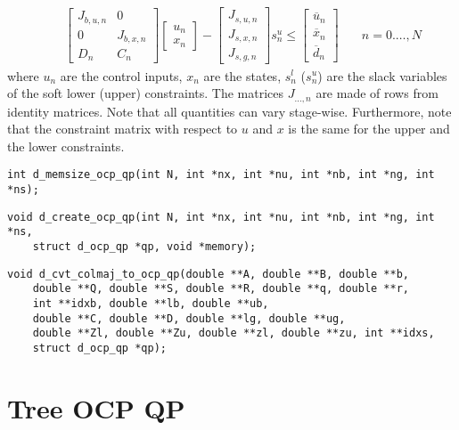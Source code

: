 \documentclass[a4paper]{report}
\begin{document}
\begin{align*}
& \quad \begin{bmatrix} J_{b,u,n} & 0 \\ 0 & J_{b,x,n} \\ D_n & C_n \end{bmatrix} \begin{bmatrix} u_n \\ x_n \end{bmatrix} - \begin{bmatrix} J_{s,u,n} \\ J_{s,x,n} \\ J_{s,g,n} \end{bmatrix} s^u_n \leq \begin{bmatrix} \overline u_n \\ \overline x_n \\ \overline d_n \end{bmatrix} & \quad n=0.\dots,N
\end{align*}
where $u_n$ are the control inputs, $x_n$ are the states, $s^l_n$ ($s^u_n$) are the slack variables of the soft lower (upper) constraints.
The matrices $J_{\dots,n}$ are made of rows from identity matrices.
Note that all quantities can vary stage-wise.
Furthermore, note that the constraint matrix with respect to $u$ and $x$ is the same for the upper and the lower constraints.

\begin{verbatim}
int d_memsize_ocp_qp(int N, int *nx, int *nu, int *nb, int *ng, int *ns);
\end{verbatim}

\begin{verbatim}
void d_create_ocp_qp(int N, int *nx, int *nu, int *nb, int *ng, int *ns, 
    struct d_ocp_qp *qp, void *memory);
\end{verbatim}

\begin{verbatim}
void d_cvt_colmaj_to_ocp_qp(double **A, double **B, double **b, 
    double **Q, double **S, double **R, double **q, double **r, 
    int **idxb, double **lb, double **ub, 
    double **C, double **D, double **lg, double **ug, 
    double **Zl, double **Zu, double **zl, double **zu, int **idxs, 
    struct d_ocp_qp *qp);
\end{verbatim}



\chapter{Tree OCP QP}
\end{document}
